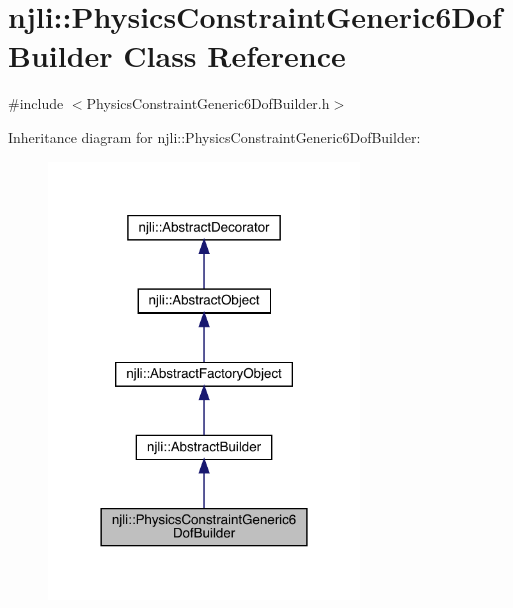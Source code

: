 \hypertarget{classnjli_1_1_physics_constraint_generic6_dof_builder}{}\section{njli\+:\+:Physics\+Constraint\+Generic6\+Dof\+Builder Class Reference}
\label{classnjli_1_1_physics_constraint_generic6_dof_builder}


{\ttfamily \#include $<$Physics\+Constraint\+Generic6\+Dof\+Builder.\+h$>$}



Inheritance diagram for njli\+:\+:Physics\+Constraint\+Generic6\+Dof\+Builder\+:\nopagebreak
\begin{figure}[H]
\begin{center}
\leavevmode
\includegraphics[width=234pt]{classnjli_1_1_physics_constraint_generic6_dof_builder__inherit__graph}
\end{center}
\end{figure}


